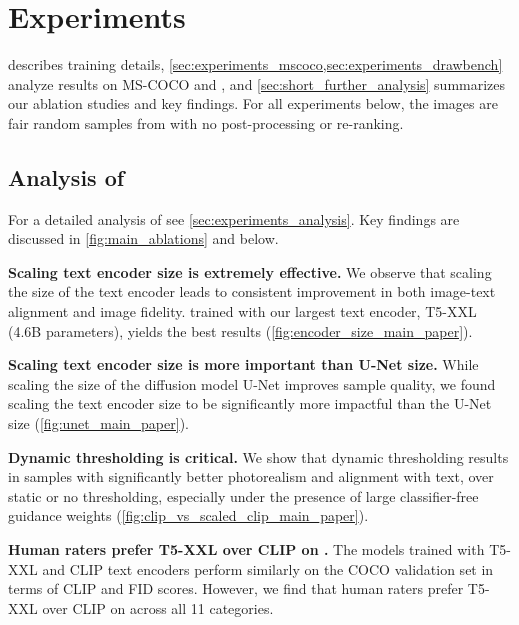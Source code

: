 \vspace{\presectionspace}
\section{Experiments}
\vspace{\postsectionspace}
\label{sec:experiments}
 describes training details, \cref{sec:experiments_mscoco,sec:experiments_drawbench} analyze results on MS-COCO and  \benchmarkname, and \cref{sec:short_further_analysis} summarizes our ablation studies and key findings. For all experiments below, the images are fair random samples from \name with no post-processing or re-ranking.






\subsection{Analysis of \name}
\vspace{-0.15cm}
\label{sec:short_further_analysis}
For a detailed analysis of \name see \cref{sec:experiments_analysis}. Key findings are discussed in \cref{fig:main_ablations} and below.




\textbf{Scaling text encoder size is extremely effective.} We observe that scaling the size of the text encoder leads to consistent improvement in both image-text alignment and image fidelity. \name trained with our largest text encoder, T5-XXL (4.6B parameters), yields the best results (\cref{fig:encoder_size_main_paper}).

\textbf{Scaling text encoder size is more important than U-Net size.} While scaling the size of the diffusion model U-Net improves sample quality, we found scaling the text encoder size to be significantly more impactful than the U-Net size (\cref{fig:unet_main_paper}).

\textbf{Dynamic thresholding is critical.} We show that dynamic thresholding results in samples with significantly better photorealism and alignment with text, over static or no thresholding, especially under the presence of large classifier-free guidance weights (\cref{fig:clip_vs_scaled_clip_main_paper}).

\textbf{Human raters prefer T5-XXL over CLIP on \benchmarkname.} The models trained with T5-XXL and CLIP text encoders perform similarly on the COCO validation set in terms of CLIP and FID scores. However, we find that human raters prefer T5-XXL over CLIP on \benchmarkname across all 11 categories.

